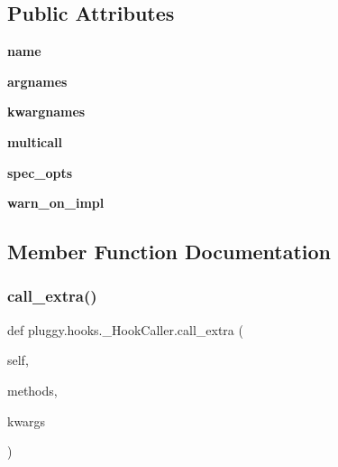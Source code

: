\subsection*{Public Attributes}
\begin{DoxyCompactItemize}
\item 
\mbox{\label{classpluggy_1_1hooks_1_1___hook_caller_a2ccd7ac42d1964a878e6b08e98bc9ce8}} 
{\bfseries name}
\item 
\mbox{\label{classpluggy_1_1hooks_1_1___hook_caller_aba3c00956627f08255035ac6d2ab5579}} 
{\bfseries argnames}
\item 
\mbox{\label{classpluggy_1_1hooks_1_1___hook_caller_a470e5b13c892448986e063b8a4e03f05}} 
{\bfseries kwargnames}
\item 
\mbox{\label{classpluggy_1_1hooks_1_1___hook_caller_a62b84e050f941527d6089587b5285a27}} 
{\bfseries multicall}
\item 
\mbox{\label{classpluggy_1_1hooks_1_1___hook_caller_aadb1b4b216f9ca435af4869ffb447fb0}} 
{\bfseries spec\+\_\+opts}
\item 
\mbox{\label{classpluggy_1_1hooks_1_1___hook_caller_a5fe00d56825e0bc5916e655f22e6d41c}} 
{\bfseries warn\+\_\+on\+\_\+impl}
\end{DoxyCompactItemize}


\subsection{Member Function Documentation}
\mbox{\label{classpluggy_1_1hooks_1_1___hook_caller_a2e890e73bd2b846c3894135c0b8e5975}} 
\subsubsection{\texorpdfstring{call\+\_\+extra()}{call\_extra()}}
{\footnotesize\ttfamily def pluggy.\+hooks.\+\_\+\+Hook\+Caller.\+call\+\_\+extra (\begin{DoxyParamCaption}\item[{}]{self,  }\item[{}]{methods,  }\item[{}]{kwargs }\end{DoxyParamCaption})}

